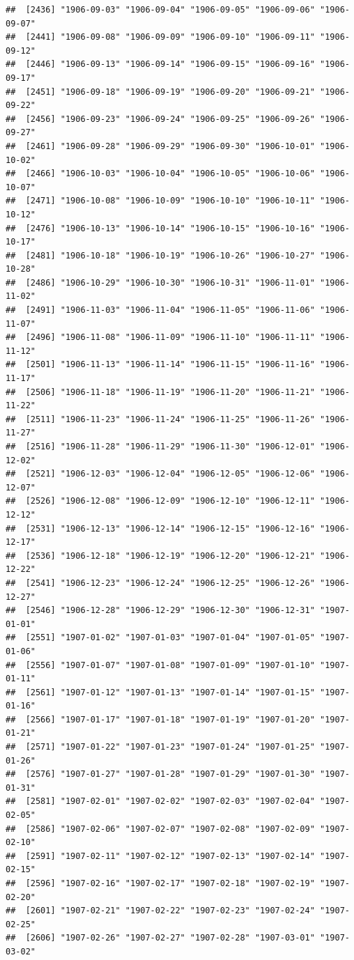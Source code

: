 \documentclass{article}\usepackage[]{graphicx}\usepackage[]{color}
\makeatletter
\newenvironment{kframe}{%
 \def\at@end@of@kframe{}%
 \ifinner\ifhmode%
  \def\at@end@of@kframe{\end{minipage}}%
  \begin{minipage}{\columnwidth}%
 \fi\fi%
 \def\FrameCommand##1{\hskip\@totalleftmargin \hskip-\fboxsep
 \colorbox{shadecolor}{##1}\hskip-\fboxsep
     \hskip-\linewidth \hskip-\@totalleftmargin \hskip\columnwidth}%
 \MakeFramed {\advance\hsize-\width
   \@totalleftmargin\z@ \linewidth\hsize
   \@setminipage}}%
 {\par\unskip\endMakeFramed%
 \at@end@of@kframe}
\newenvironment{knitrout}{}{} %
\makeatother
\begin{document}
\begin{description}
\begin{knitrout}
\begin{kframe}
\begin{verbatim}
##  [2436] "1906-09-03" "1906-09-04" "1906-09-05" "1906-09-06" "1906-09-07"
##  [2441] "1906-09-08" "1906-09-09" "1906-09-10" "1906-09-11" "1906-09-12"
##  [2446] "1906-09-13" "1906-09-14" "1906-09-15" "1906-09-16" "1906-09-17"
##  [2451] "1906-09-18" "1906-09-19" "1906-09-20" "1906-09-21" "1906-09-22"
##  [2456] "1906-09-23" "1906-09-24" "1906-09-25" "1906-09-26" "1906-09-27"
##  [2461] "1906-09-28" "1906-09-29" "1906-09-30" "1906-10-01" "1906-10-02"
##  [2466] "1906-10-03" "1906-10-04" "1906-10-05" "1906-10-06" "1906-10-07"
##  [2471] "1906-10-08" "1906-10-09" "1906-10-10" "1906-10-11" "1906-10-12"
##  [2476] "1906-10-13" "1906-10-14" "1906-10-15" "1906-10-16" "1906-10-17"
##  [2481] "1906-10-18" "1906-10-19" "1906-10-26" "1906-10-27" "1906-10-28"
##  [2486] "1906-10-29" "1906-10-30" "1906-10-31" "1906-11-01" "1906-11-02"
##  [2491] "1906-11-03" "1906-11-04" "1906-11-05" "1906-11-06" "1906-11-07"
##  [2496] "1906-11-08" "1906-11-09" "1906-11-10" "1906-11-11" "1906-11-12"
##  [2501] "1906-11-13" "1906-11-14" "1906-11-15" "1906-11-16" "1906-11-17"
##  [2506] "1906-11-18" "1906-11-19" "1906-11-20" "1906-11-21" "1906-11-22"
##  [2511] "1906-11-23" "1906-11-24" "1906-11-25" "1906-11-26" "1906-11-27"
##  [2516] "1906-11-28" "1906-11-29" "1906-11-30" "1906-12-01" "1906-12-02"
##  [2521] "1906-12-03" "1906-12-04" "1906-12-05" "1906-12-06" "1906-12-07"
##  [2526] "1906-12-08" "1906-12-09" "1906-12-10" "1906-12-11" "1906-12-12"
##  [2531] "1906-12-13" "1906-12-14" "1906-12-15" "1906-12-16" "1906-12-17"
##  [2536] "1906-12-18" "1906-12-19" "1906-12-20" "1906-12-21" "1906-12-22"
##  [2541] "1906-12-23" "1906-12-24" "1906-12-25" "1906-12-26" "1906-12-27"
##  [2546] "1906-12-28" "1906-12-29" "1906-12-30" "1906-12-31" "1907-01-01"
##  [2551] "1907-01-02" "1907-01-03" "1907-01-04" "1907-01-05" "1907-01-06"
##  [2556] "1907-01-07" "1907-01-08" "1907-01-09" "1907-01-10" "1907-01-11"
##  [2561] "1907-01-12" "1907-01-13" "1907-01-14" "1907-01-15" "1907-01-16"
##  [2566] "1907-01-17" "1907-01-18" "1907-01-19" "1907-01-20" "1907-01-21"
##  [2571] "1907-01-22" "1907-01-23" "1907-01-24" "1907-01-25" "1907-01-26"
##  [2576] "1907-01-27" "1907-01-28" "1907-01-29" "1907-01-30" "1907-01-31"
##  [2581] "1907-02-01" "1907-02-02" "1907-02-03" "1907-02-04" "1907-02-05"
##  [2586] "1907-02-06" "1907-02-07" "1907-02-08" "1907-02-09" "1907-02-10"
##  [2591] "1907-02-11" "1907-02-12" "1907-02-13" "1907-02-14" "1907-02-15"
##  [2596] "1907-02-16" "1907-02-17" "1907-02-18" "1907-02-19" "1907-02-20"
##  [2601] "1907-02-21" "1907-02-22" "1907-02-23" "1907-02-24" "1907-02-25"
##  [2606] "1907-02-26" "1907-02-27" "1907-02-28" "1907-03-01" "1907-03-02"

\end{verbatim}
\end{kframe}
\end{knitrout}
\end{description}
\end{document}
